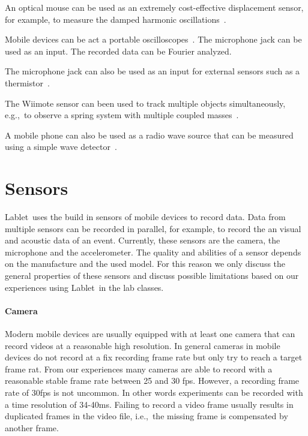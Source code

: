 \documentclass{sigchi}
\newcommand{\eg}{e.g.,\ }
\newcommand{\ie}{i.e.,\ }
\newcommand{\lablet}{Lablet\ }
\begin{document}

An optical mouse can be used as an extremely cost-effective displacement sensor, for example, to measure the damped harmonic oscillations~\cite{Ng2005}.

Mobile devices can be act a portable oscilloscopes~\cite{Forinash2012}.
The microphone jack can be used as an input.
The recorded data can be Fourier analyzed.

The microphone jack can also be used as an input for external sensors such as a thermistor~\cite{Forinash2012}.

The Wiimote sensor can been used to track multiple objects simultaneously, \eg to observe a spring system with multiple coupled masses~\cite{Skeffington2012}.

A mobile phone can also be used as a radio wave source that can be measured using a simple wave detector~\cite{Hare2010}.


\section{Sensors}\label{sec:Sensors}
\lablet uses the build in sensors of mobile devices to record data.
Data from multiple sensors can be recorded in parallel, for example, to record the an visual and acoustic data of an event.
Currently, these sensors are the camera, the microphone and the accelerometer.
The quality and abilities of a sensor depends on the manufacture and the used model.
For this reason we only discuss the general properties of these sensors and discuss possible limitations based on our experiences using \lablet in the lab classes.

\paragraph{Camera}
Modern mobile devices are usually equipped with at least one camera that can record videos at a reasonable high resolution.
In general cameras in mobile devices do not record at a fix recording frame rate but only try to reach a target frame rat.
From our experiences many cameras are able to record with a reasonable stable frame rate between 25 and 30 fps.
However, a recording frame rate of 30fps is not uncommon.
In other words experiments can be recorded with a time resolution of 34-40ms.
Failing to record a video frame usually results in duplicated frames in the video file, \ie the missing frame is compensated by another frame.
\end{document}
